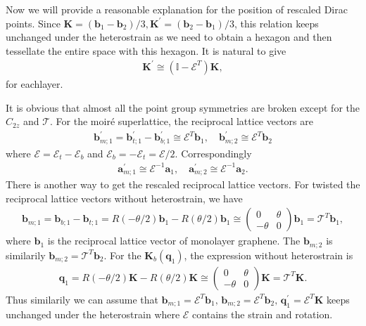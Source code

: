\documentclass[10pt, oneside]{article}
\newcommand{\te}{\theta}
\newcommand{\pr}{\prime}
\newcommand{\p}[1]{\left(#1\right)}
\begin{document}
Now we will provide a reasonable explanation for the position of rescaled Dirac points. Since \(\bm{K} = \p{\bm{b}_{1} - \bm{b}_{2}}/3, \bm{K}^\pr = \p{\bm{b}_{2} - \bm{b}_{1}}/3\), this relation keeps unchanged under the heterostrain as we need to obtain a hexagon and then tessellate the entire space with this hexagon. It is natural to give 
\begin{align}
	\bm{K}^{\pr} \cong \p{\mathbb{I} - \mathcal{E}^{T}} \bm{K},
\end{align}
for eachlayer. 

It is obvious that almost all the point group symmetries are broken except for the \(C_{2z}\) and \(\mathcal{T}\). For the moiré superlattice, the reciprocal lattice vectors are
\begin{align}
	\bm{b}^{\pr}_{m;1} = \bm{b}^{\pr}_{t;1} - \bm{b}^{\pr}_{b;1} \cong \mathcal{E}^{T} \bm{b}_{1},\quad \bm{b}^{\pr}_{m;2} \cong \mathcal{E}^{T} \bm{b}_{2}  
\end{align}
where \(\mathcal{E} = \mathcal{E}_{t} - \mathcal{E}_{b}\) and \(\mathcal{E}_{b} = - \mathcal{E}_{t} = \mathcal{E}/2\). Correspondingly
\begin{align}
	\bm{a}^{\pr}_{m;1} \cong \mathcal{E}^{-1} \bm{a}_{1}, \quad \bm{a}^{\pr}_{m;2} \cong \mathcal{E}^{-1} \bm{a}_{2}.
\end{align}
There is another way to get the rescaled reciprocal lattice vectors. For twisted the reciprocal lattice vectors without heterostrain, we have 
\begin{align}
	\bm{b}_{m;1} = \bm{b}_{b;1} - \bm{b}_{t;1} = R \p{-\te/2} \bm{b}_{1} - R \p{\te/2} \bm{b}_{1} \cong \begin{pmatrix}
		0 & \te \\
		-\te & 0	
	\end{pmatrix} \bm{b}_{1} = \mathcal{T}^{T} \bm{b}_{1},
\end{align}
where \(\bm{b}_1\) is the reciprocal lattice vector of monolayer graphene. The \(\bm{b}_{m;2}\) is similarily \(\bm{b}_{m;2} = \mathcal{T}^{T} \bm{b}_{2}\). For the \(\bm{K}_{b}(\bm{q}_{1})\), the expression without heterostrain is
\begin{align}
	\bm{q}_{1} = R \p{-\te/2} \bm{K} - R \p{\te/2} \bm{K} \cong \begin{pmatrix}
		0 & \te \\
		- \te & 0	
	\end{pmatrix} \bm{K} =  \mathcal{T}^{T} \bm{K}.
\end{align}
Thus similarily we can assume that \(\bm{b}_{m;1} = \mathcal{E}^{T} \bm{b}_1, \, \bm{b}_{m;2} = \mathcal{E}^{T} \bm{b}_2,\,\bm{q}^{\pr}_{1} = \mathcal{E}^{T} \bm{K}\) keeps unchanged under the heterostrain where \(\mathcal{E}\) contains the strain and rotation.
\end{document}
